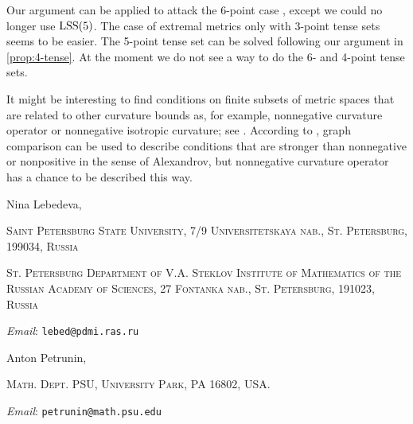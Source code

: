 \documentclass{article}
\makeatletter
\newcommand{\Addresses}{{\bigskip\footnotesize

\noindent Nina Lebedeva,
\par\nopagebreak
 \textsc{Saint Petersburg State University, 7/9 Universitetskaya nab., St. Petersburg, 199034, Russia}
\par
\nopagebreak
 \textsc{St. Petersburg Department of V.A. Steklov Institute of Mathematics of the Russian Academy of Sciences, 27 Fontanka nab., St. Petersburg, 191023, Russia}
  \par\nopagebreak
  \textit{Email}: \texttt{lebed@pdmi.ras.ru}

\medskip

\noindent   Anton Petrunin, 
\par\nopagebreak
 \textsc{Math. Dept. PSU, University Park, PA 16802, USA.}
  \par\nopagebreak
  \textit{Email}: \texttt{petrunin@math.psu.edu}
  
}}
\makeatother
\begin{document}
Our argument can be applied to attack the 6-point case \cite[Question~6.3]{lebedeva-petrunin}, except we could no longer use $\mathrm{LSS}(5)$.
The case of extremal metrics only with 3-point tense sets seems to be easier. 
The 5-point tense set can be solved following our argument in \ref{prop:4-tense}.
At the moment we do not see a way to do the 6- and 4-point tense sets.

It might be interesting to find conditions on finite subsets of metric spaces that are related to other curvature bounds as, for example, nonnegative curvature operator or nonnegative isotropic curvature; see \cite[1.19$_+(e)$]{gromov}.
According to \cite{lebedeva-petrunin-graph-alex}, graph comparison can be used to describe conditions that are stronger than nonnegative or nonpositive in the sense of Alexandrov, but nonnegative curvature operator has a chance to be described this way.



{\sloppy
\printbibliography[heading=bibintoc]
\fussy
}

\Addresses
\end{document}
